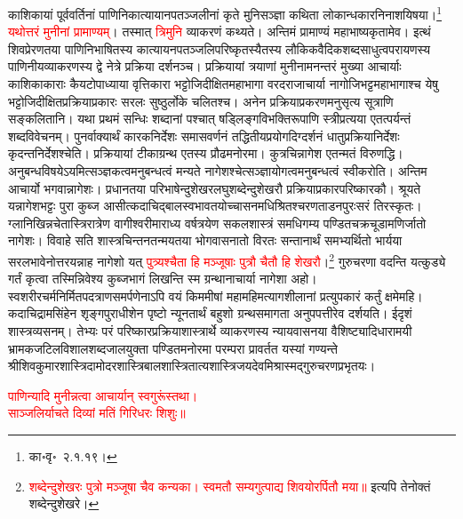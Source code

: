 \begin{sloppypar}\justifying\noindent काशिकायां पूर्व\-वर्तिनां पाणिनि\-कात्यायान\-पतञ्जलीनां कृते मुनि\-सञ्ज्ञा कथिता लोकान्धकार\-निनाशयिषया।\footnote{का॰वृ॰~२.१.१९।} \textcolor{red}{यथोत्तरं मुनीनां प्रामाण्यम्}। तस्मात् \textcolor{red}{त्रिमुनि} व्याकरणं कथ्यते। अन्तिमं प्रामाण्यं महाभाष्यकृतामेव। इत्थं शिवप्रेरणतया पाणिनि\-भाषितस्य कात्यायन\-पतञ्जलि\-परिष्कृतस्यैतस्य लौकिक\-वैदिक\-शब्द\-साधुत्व\-परायणस्य पाणिनीय\-व्याकरणस्य द्वे नेत्रे प्रक्रिया दर्शनञ्च। प्रक्रियायां त्रयाणां मुनीनामनन्तरं मुख्या आचार्याः काशिकाकाराः कैयटोपाध्याया वृत्तिकारा भट्टोजिदीक्षित\-महाभागा वरदराजाचार्या नागोजिभट्ट\-महा\-भागाश्च येषु भट्टोजिदीक्षित\-प्रक्रिया\-प्रकारः सरलः सुष्ठुर्लोके चलितश्च। अनेन प्रक्रिया\-प्रकरणमनुसृत्य सूत्राणि सङ्कलितानि। यथा प्रथमं सन्धिः शब्दानां पश्चात् षड्लिङ्ग\-विभक्ति\-रूपाणि स्त्री\-प्रत्यया एतत्पर्यन्तं शब्द\-विवेचनम्। पुनर्वाक्यार्थं कारक\-निर्देशः समास\-वर्णनं तद्धितीय\-प्रयोग\-दिग्दर्शनं धातु\-प्रक्रिया\-निर्देशः कृदन्त\-निर्देशश्चेति। प्रक्रियायां टीका\-ग्रन्थ एतस्य प्रौढ\-मनोरमा। कुत्रचिन्नागेश एतन्मतं विरुणद्धि। अनुबन्ध\-विषयेऽयमित्सञ्ज्ञकत्वमनुबन्धत्वं मन्यते नागेशश्चेत्सञ्ज्ञा\-योगत्वमनुबन्धत्वं स्वीकरोति।
अन्तिम आचार्यो भगवान्नागेशः। प्रधानतया परिभाषेन्दुशेखर\-लघुशब्देन्दुशेखरौ प्रक्रिया\-प्रकार\-परिष्कारकौ। श्रूयते यन्नागेशभट्टः पुरा कुब्ज आसीत्कदाचिद्बाल\-स्वभावतयोच्चासनमधिश्रितश्चरण\-ताडन\-पुरःसरं तिरस्कृतः। ग्लानि\-खिन्न\-चेतास्त्रिरात्रेण वागीश्वरीमाराध्य वर्ष\-त्रयेण सकल\-शास्त्रं समधिगम्य पण्डित\-चक्र\-चूडामणिर्जातो नागेशः। विवाहे सति शास्त्र\-चिन्तन\-तन्मयतया भोग\-वासनातो विरतः सन्तानार्थं समभ्यर्थितो भार्यया सरल\-भावेनोत्तरयन्नाह नागेशो यत् \textcolor{red}{पुत्र्यश्चैता हि मञ्जूषाः पुत्रौ चैतौ हि शेखरौ}।\footnote{\textcolor{red}{शब्देन्दुशेखरः पुत्रो मञ्जूषा चैव कन्यका। स्वमतौ सम्यगुत्पाद्य शिवयोरर्पितौ मया॥} इत्यपि तेनोक्तं शब्देन्दु\-शेखरे।} गुरु\-चरणा वदन्ति यत्कुड्ये गर्तं कृत्वा तस्मिन्निवेश्य कुब्ज\-भागं लिखन्ति स्म ग्रन्थानाचार्या नागेशा अहो। स्वशरीर\-चर्म\-निर्मित\-पदत्राण\-समर्पणेनाऽपि वयं किममीषां महामहिम\-त्यागशीलानां प्रत्युपकारं कर्तुं क्षमेमहि। कदाचिद्राम\-सिंहेन शृङ्गपुराधीशेन पृष्टो न्यूनतार्थं बहुशो ग्रन्थ\-समागता अनुपपत्तीरेव दर्शयति। ईदृशं शास्त्र\-व्यसनम्। तेभ्यः परं परिष्कार\-प्रक्रिया\-शास्त्रार्थे व्याकरणस्य न्याय\-वासनया वैशिष्ट्यादि\-धारा\-मयी भ्रामक\-जटिल\-विशाल\-शब्द\-जाल\-युक्ता पण्डित\-मनोरमा परम्परा प्रावर्तत यस्यां गण्यन्ते श्री\-शिवकुमार\-शास्त्रि\-दामोदर\-शास्त्रि\-बाल\-शास्त्रि\-तात्य\-शास्त्रि\-जयदेव\-मिश्रास्मद्गुरु\-चरण\-प्रभृतयः।\end{sloppypar}
\centering\textcolor{red}{पाणिन्यादि मुनीन्नत्वा आचार्यान् स्वगुरूंस्तथा।\nopagebreak\\
साञ्जलिर्याचते दिव्यां मतिं गिरिधरः शिशुः॥}\nopagebreak\\
